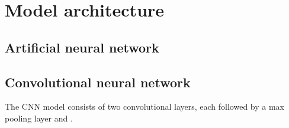 \section{Model architecture}

\subsection{Artificial neural network}

\subsection{Convolutional neural network}

The CNN model consists of two convolutional layers, each followed by a max pooling layer and . 